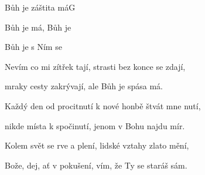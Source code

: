 \begin{song}{Bůh je záštita má}{G}{}

\begin{SBChorus}

Bůh je  má, Bůh je   

Bůh je   s Ním  se 

\end{SBChorus}

\begin{SBVerse}

Nevím co mi zítřek tají, strasti bez konce se zdají,

mraky cesty zakrývají, ale Bůh je spása má.

\end{SBVerse}

\begin{SBVerse}
Každý den od procitnutí k nové honbě štvát mne nutí,

nikde místa k spočinutí, jenom v Bohu najdu mír.

\end{SBVerse}

\begin{SBVerse}

Kolem svět se rve a plení, lidské vztahy zlato mění,

Bože, dej, ať v pokušení, vím, že Ty se staráš sám.

\end{SBVerse}

\end{song}

